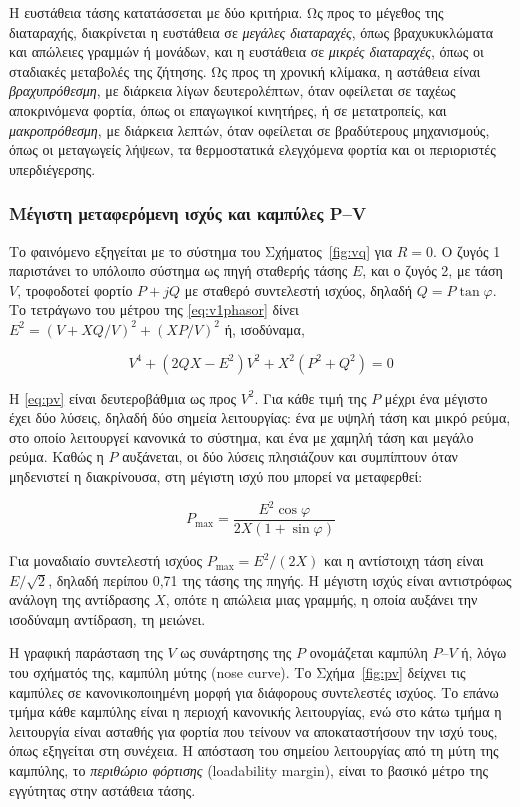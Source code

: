Η ευστάθεια τάσης κατατάσσεται με δύο κριτήρια. Ως προς το μέγεθος της διαταραχής, διακρίνεται
η ευστάθεια σε \emph{μεγάλες διαταραχές}, όπως βραχυκυκλώματα και απώλειες γραμμών ή μονάδων,
και η ευστάθεια σε \emph{μικρές διαταραχές}, όπως οι σταδιακές μεταβολές της ζήτησης. Ως προς
τη χρονική κλίμακα, η αστάθεια είναι \emph{βραχυπρόθεσμη}, με διάρκεια λίγων δευτερολέπτων,
όταν οφείλεται σε ταχέως αποκρινόμενα φορτία, όπως οι επαγωγικοί κινητήρες, ή σε μετατροπείς,
και \emph{μακροπρόθεσμη}, με διάρκεια λεπτών, όταν οφείλεται σε βραδύτερους μηχανισμούς, όπως
οι μεταγωγείς λήψεων, τα θερμοστατικά ελεγχόμενα φορτία και οι περιοριστές υπερδιέγερσης.

\subsubsection{Μέγιστη μεταφερόμενη ισχύς και καμπύλες P--V}

Το φαινόμενο εξηγείται με το σύστημα του Σχήματος~\ref{fig:vq} για $R = 0$. Ο ζυγός 1
παριστάνει το υπόλοιπο σύστημα ως πηγή σταθερής τάσης $E$, και ο ζυγός 2, με τάση $V$,
τροφοδοτεί φορτίο $P + jQ$ με σταθερό συντελεστή ισχύος, δηλαδή $Q = P\tan\varphi$. Το
τετράγωνο του μέτρου της \eqref{eq:v1phasor} δίνει $E^2 = (V + XQ/V)^2 + (XP/V)^2$ ή,
ισοδύναμα,

\begin{equation}
V^4 + \left(2QX - E^2\right) V^2 + X^2\left(P^2 + Q^2\right) = 0
\label{eq:pv}
\end{equation}

Η \eqref{eq:pv} είναι δευτεροβάθμια ως προς $V^2$. Για κάθε τιμή της $P$ μέχρι ένα μέγιστο
έχει δύο λύσεις, δηλαδή δύο σημεία λειτουργίας: ένα με υψηλή τάση και μικρό ρεύμα, στο οποίο
λειτουργεί κανονικά το σύστημα, και ένα με χαμηλή τάση και μεγάλο ρεύμα. Καθώς η $P$ αυξάνεται,
οι δύο λύσεις πλησιάζουν και συμπίπτουν όταν μηδενιστεί η διακρίνουσα, στη μέγιστη ισχύ που
μπορεί να μεταφερθεί:

\begin{equation}
P_{\max} = \frac{E^2 \cos\varphi}{2X\left(1 + \sin\varphi\right)}
\label{eq:pmax}
\end{equation}

Για μοναδιαίο συντελεστή ισχύος $P_{\max} = E^2/(2X)$ και η αντίστοιχη τάση είναι
$E/\sqrt{2}$, δηλαδή περίπου 0,71 της τάσης της πηγής. Η μέγιστη ισχύς είναι αντιστρόφως
ανάλογη της αντίδρασης $X$, οπότε η απώλεια μιας γραμμής, η οποία αυξάνει την ισοδύναμη
αντίδραση, τη μειώνει.

Η γραφική παράσταση της $V$ ως συνάρτησης της $P$ ονομάζεται καμπύλη $P$--$V$ ή, λόγω του
σχήματός της, καμπύλη μύτης (nose curve). Το Σχήμα~\ref{fig:pv} δείχνει τις καμπύλες σε
κανονικοποιημένη μορφή για διάφορους συντελεστές ισχύος. Το επάνω τμήμα κάθε καμπύλης είναι η
περιοχή κανονικής λειτουργίας, ενώ στο κάτω τμήμα η λειτουργία είναι ασταθής για φορτία που
τείνουν να αποκαταστήσουν την ισχύ τους, όπως εξηγείται στη συνέχεια. Η απόσταση του σημείου
λειτουργίας από τη μύτη της καμπύλης, το \emph{περιθώριο φόρτισης} (loadability margin),
είναι το βασικό μέτρο της εγγύτητας στην αστάθεια τάσης.

